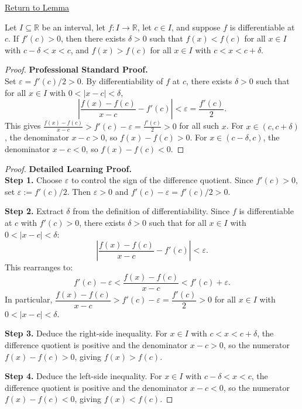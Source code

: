 \newpage
{}
\label{prf:positive-derivative-implies-locally-increasing}

\begin{remark*}[Return]
\hyperref[lem:positive-derivative-implies-locally-increasing]{Return to Lemma}
\end{remark*}

\begin{theorem*}
Let $I \subseteq \mathbb{R}$ be an interval, let $f : I \to \mathbb{R}$, let $c \in I$, and suppose $f$ is differentiable at $c$. If $f'(c) > 0$, then there exists $\delta > 0$ such that $f(x) < f(c)$ for all $x \in I$ with $c - \delta < x < c$, and $f(x) > f(c)$ for all $x \in I$ with $c < x < c + \delta$.
\end{theorem*}

\begin{proof}
\textbf{Professional Standard Proof.}~\\
Set $\varepsilon = f'(c)/2 > 0$. By differentiability of $f$ at $c$, there exists $\delta > 0$ such that for all $x \in I$ with $0 < |x-c| < \delta$,
\[
\left|\frac{f(x)-f(c)}{x-c} - f'(c)\right| < \varepsilon = \frac{f'(c)}{2}.
\]
This gives $\frac{f(x)-f(c)}{x-c} > f'(c) - \varepsilon = \frac{f'(c)}{2} > 0$ for all such $x$. For $x \in (c, c+\delta)$, the denominator $x - c > 0$, so $f(x) - f(c) > 0$. For $x \in (c-\delta, c)$, the denominator $x - c < 0$, so $f(x) - f(c) < 0$.
\end{proof}

\begin{proof}
\textbf{Detailed Learning Proof.}~\\

\textbf{Step 1.} Choose $\varepsilon$ to control the sign of the difference quotient. Since $f'(c) > 0$, set $\varepsilon := f'(c)/2$. Then $\varepsilon > 0$ and $f'(c) - \varepsilon = f'(c)/2 > 0$.

\textbf{Step 2.} Extract $\delta$ from the definition of differentiability. Since $f$ is differentiable at $c$ with $f'(c) > 0$, there exists $\delta > 0$ such that for all $x \in I$ with $0 < |x-c| < \delta$:
\[
\left|\frac{f(x)-f(c)}{x-c} - f'(c)\right| < \varepsilon.
\]
This rearranges to:
\[
f'(c) - \varepsilon < \frac{f(x)-f(c)}{x-c} < f'(c) + \varepsilon.
\]
In particular, $\dfrac{f(x)-f(c)}{x-c} > f'(c) - \varepsilon = \dfrac{f'(c)}{2} > 0$ for all $x \in I$ with $0 < |x-c| < \delta$.

\textbf{Step 3.} Deduce the right-side inequality. For $x \in I$ with $c < x < c+\delta$, the difference quotient is positive and the denominator $x - c > 0$, so the numerator $f(x) - f(c) > 0$, giving $f(x) > f(c)$.

\textbf{Step 4.} Deduce the left-side inequality. For $x \in I$ with $c - \delta < x < c$, the difference quotient is positive and the denominator $x - c < 0$, so the numerator $f(x) - f(c) < 0$, giving $f(x) < f(c)$.
\end{proof}

